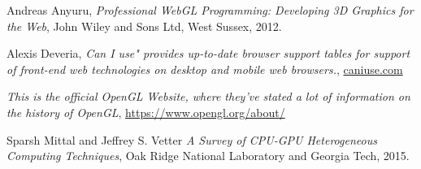 
\begin{thebibliography}{9}

  Andreas Anyuru,
  \emph{Professional WebGL Programming: Developing 3D Graphics for the Web},
  John Wiley and Sons Ltd, West Sussex,
  2012.
  
  Alexis Deveria,
  \emph{Can I use" provides up-to-date browser support tables for support of front-end web technologies on desktop and mobile web browsers.},
  \url{caniuse.com}
  
	\emph{This is the official OpenGL Website, where they've stated a lot of information on the history of OpenGL},
	\url{https://www.opengl.org/about/}
	
	Sparsh Mittal and Jeffrey S. Vetter
	\emph{A Survey of CPU-GPU Heterogeneous Computing Techniques},
	Oak Ridge National Laboratory and Georgia Tech,
	2015.

\end{thebibliography}